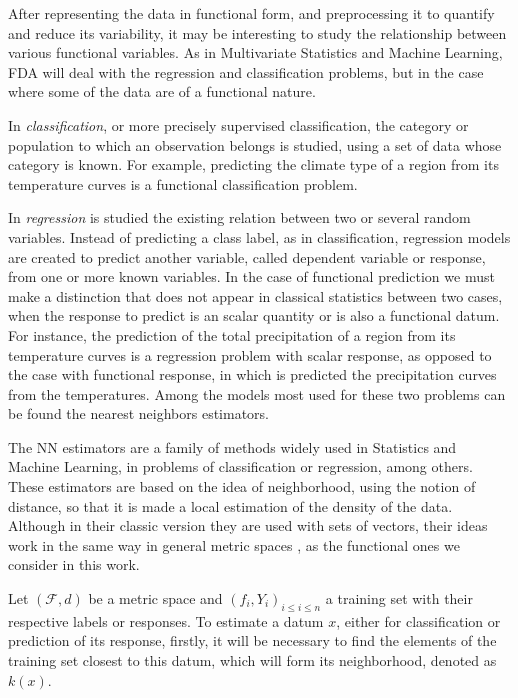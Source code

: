
After representing the data in functional form, and preprocessing it to quantify and
reduce its variability, it may be interesting to study the relationship between
various functional variables. As in Multivariate Statistics and Machine Learning,
\acs{FDA} will deal with the regression and classification problems, but in the case
where some of the data are of a functional nature.


In \textit{classification}, or more precisely supervised classification, the category or
population to which an observation belongs is studied, using a set of data whose
category is known. For example, predicting the climate type of a region from
its temperature curves is a functional classification problem.

In \textit{regression} is studied the existing relation between two or several
random variables. Instead of predicting a class label, as in classification,
regression models are created to predict another variable, called dependent
variable or response, from one or more known variables. In the case of
functional prediction we must make a distinction that does not appear in
classical statistics between two cases, when the response to predict is an
scalar quantity or is also a functional datum. For instance, the prediction of
the total precipitation of a region from its temperature curves is a regression
problem with scalar response, as opposed to the case with functional response,
in which is predicted the precipitation curves from the temperatures.
Among the models most used for these two problems can be found the nearest
neighbors estimators.



The \ac{NN} estimators are a family of methods widely
used in Statistics and Machine Learning, in problems of classification or
regression, among others. These estimators are based on the idea of
neighborhood, using the notion of distance, so that it is made a local
estimation of the density of the data.
Although in their classic version they are used with sets of vectors,
their ideas work in the same way in general metric
spaces \cite{baillo2010}, as the functional ones we consider in this work.

Let $(\mathcal{F}, d)$ be a metric space and
$(f_i, {Y}_i)_{i \le i \le n}$ a training set with their
respective labels or responses.
To estimate a datum $x$, either for classification or prediction of its
response, firstly, it will be necessary to find the elements of the training set
closest to this datum, which will form its neighborhood, denoted as $k(x)$.

